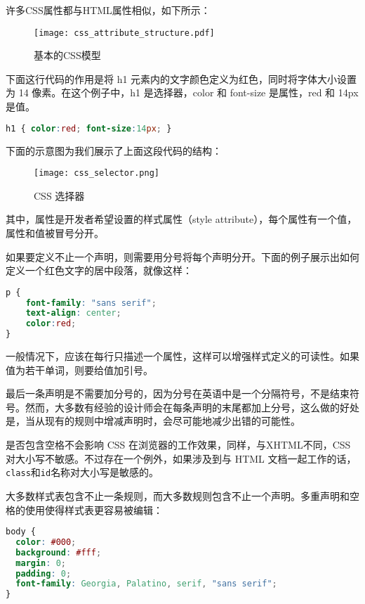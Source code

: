 许多CSS属性都与HTML属性相似，如下所示：

\begin{figure}[!h]
\centering
\texttt{[image: css\_attribute\_structure.pdf]}
\vspace{-10pt}

\caption{基本的CSS模型}
\label{css_attribute_structure}
\end{figure}

下面这行代码的作用是将 h1 元素内的文字颜色定义为红色，同时将字体大小设置为 14 像素。在这个例子中，h1 是选择器，color 和 font-size 是属性，red 和 14px 是值。

\begin{lstlisting}[language=CSS]
h1 { color:red; font-size:14px; }
\end{lstlisting}

下面的示意图为我们展示了上面这段代码的结构：

\begin{figure}[!h]
\centering
\texttt{[image: css\_selector.png]}
\vspace{-10pt}
\caption{CSS 选择器}
\label{css_selector}
\end{figure}

其中，属性是开发者希望设置的样式属性（style attribute），每个属性有一个值，属性和值被冒号分开。

如果要定义不止一个声明，则需要用分号将每个声明分开。下面的例子展示出如何定义一个红色文字的居中段落，就像这样：

\begin{lstlisting}[language=CSS]
p {
    font-family: "sans serif"; 
    text-align: center; 
    color:red;
}
\end{lstlisting}

一般情况下，应该在每行只描述一个属性，这样可以增强样式定义的可读性。如果值为若干单词，则要给值加引号。

最后一条声明是不需要加分号的，因为分号在英语中是一个分隔符号，不是结束符号。然而，大多数有经验的设计师会在每条声明的末尾都加上分号，这么做的好处是，当从现有的规则中增减声明时，会尽可能地减少出错的可能性。

是否包含空格不会影响 CSS 在浏览器的工作效果，同样，与XHTML不同，CSS对大小写不敏感。不过存在一个例外，如果涉及到与 HTML 文档一起工作的话，\texttt{class}和\texttt{id}名称对大小写是敏感的。

大多数样式表包含不止一条规则，而大多数规则包含不止一个声明。多重声明和空格的使用使得样式表更容易被编辑：

\begin{lstlisting}[language=CSS]
body {
  color: #000;
  background: #fff;
  margin: 0;
  padding: 0;
  font-family: Georgia, Palatino, serif, "sans serif";
}
\end{lstlisting}




